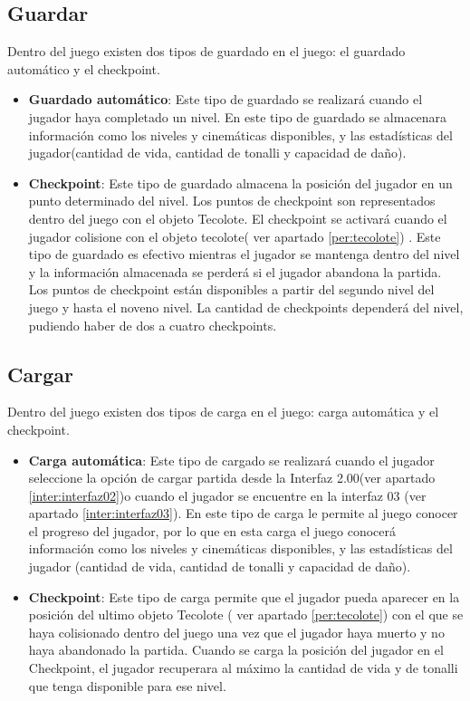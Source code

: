 \subsection{Guardar}
Dentro del juego existen dos tipos de guardado en el juego: el guardado automático y el checkpoint. 
\begin{itemize}
\item \textbf{Guardado automático}: 
Este tipo de guardado se realizará cuando el jugador haya completado un nivel. En este tipo de guardado se almacenara información como los niveles y cinemáticas disponibles, y las estadísticas del jugador(cantidad de vida, cantidad de tonalli y capacidad de daño). 
\item \textbf{Checkpoint}: 
Este tipo de guardado almacena la posición del jugador en un punto determinado del nivel. Los puntos de checkpoint son representados dentro del juego con el objeto Tecolote. El checkpoint se activará cuando el jugador colisione con el objeto tecolote( ver apartado \ref{per:tecolote}) . Este tipo de guardado es efectivo mientras el jugador se mantenga dentro del nivel y la información almacenada se perderá si el jugador abandona la partida.
Los puntos de checkpoint están disponibles a partir del segundo nivel del juego y hasta el noveno nivel. La cantidad de checkpoints dependerá del nivel, pudiendo haber de dos a cuatro checkpoints. 
\end{itemize}
\subsection{Cargar}
Dentro del juego existen dos tipos de carga en el juego: carga automática y el checkpoint. 
\begin{itemize}
\item \textbf{Carga automática}: 
Este tipo de cargado se realizará cuando el jugador seleccione la opción de cargar partida desde la Interfaz 2.00(ver apartado \ref{inter:interfaz02})o cuando el jugador se encuentre en la interfaz 03 (ver apartado \ref{inter:interfaz03}). En este tipo de carga le permite al juego conocer el progreso del jugador, por lo que en esta carga el juego conocerá información como los niveles y cinemáticas disponibles, y las estadísticas del jugador (cantidad de vida, cantidad de tonalli y capacidad de daño). 
\item \textbf{Checkpoint}: 
Este tipo de carga permite que el jugador pueda aparecer en la posición del ultimo objeto Tecolote ( ver apartado \ref{per:tecolote}) con el que se haya colisionado dentro del juego una vez que el jugador haya muerto y no haya abandonado la partida. Cuando se carga la posición del jugador en el Checkpoint, el jugador recuperara al máximo la cantidad de vida y de tonalli que tenga disponible para ese nivel.
\end{itemize}
			
